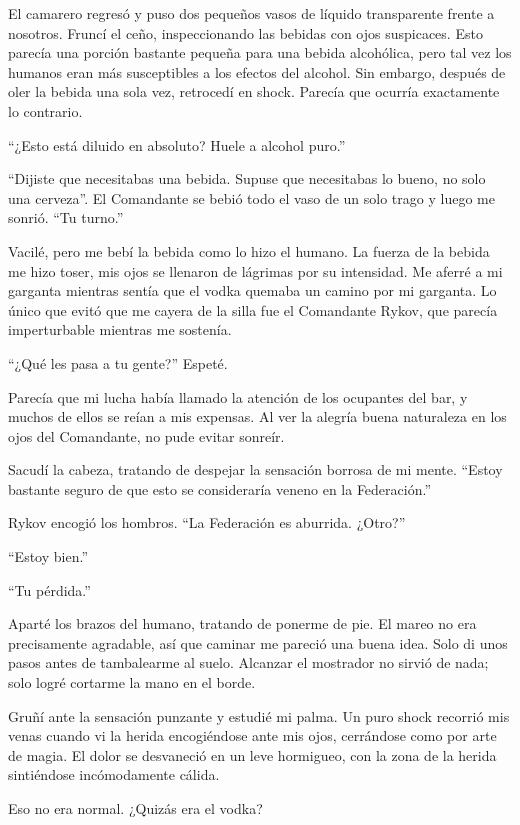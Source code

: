 \documentclass[spanish,12pt,a4paper,oneside,titlepage]{book}
\begin{document}
    El camarero regresó y puso dos pequeños vasos de líquido transparente frente a nosotros. Fruncí el ceño, inspeccionando las bebidas con ojos suspicaces. Esto parecía una porción bastante pequeña para una bebida alcohólica, pero tal vez los humanos eran más susceptibles a los efectos del alcohol. Sin embargo, después de oler la bebida una sola vez, retrocedí en shock. Parecía que ocurría exactamente lo contrario.

    ``¿Esto está diluido en absoluto? Huele a alcohol puro.''

    ``Dijiste que necesitabas una bebida. Supuse que necesitabas lo bueno, no solo una cerveza''. El Comandante se bebió todo el vaso de un solo trago y luego me sonrió. ``Tu turno.''

    Vacilé, pero me bebí la bebida como lo hizo el humano. La fuerza de la bebida me hizo toser, mis ojos se llenaron de lágrimas por su intensidad. Me aferré a mi garganta mientras sentía que el vodka quemaba un camino por mi garganta. Lo único que evitó que me cayera de la silla fue el Comandante Rykov, que parecía imperturbable mientras me sostenía.

    ``¿Qué les pasa a tu gente?'' Espeté.

    Parecía que mi lucha había llamado la atención de los ocupantes del bar, y muchos de ellos se reían a mis expensas. Al ver la alegría buena naturaleza en los ojos del Comandante, no pude evitar sonreír.

    Sacudí la cabeza, tratando de despejar la sensación borrosa de mi mente. ``Estoy bastante seguro de que esto se consideraría veneno en la Federación.''

    Rykov encogió los hombros. ``La Federación es aburrida. ¿Otro?''

    ``Estoy bien.''

    ``Tu pérdida.''

    Aparté los brazos del humano, tratando de ponerme de pie. El mareo no era precisamente agradable, así que caminar me pareció una buena idea. Solo di unos pasos antes de tambalearme al suelo. Alcanzar el mostrador no sirvió de nada; solo logré cortarme la mano en el borde.

    Gruñí ante la sensación punzante y estudié mi palma. Un puro shock recorrió mis venas cuando vi la herida encogiéndose ante mis ojos, cerrándose como por arte de magia. El dolor se desvaneció en un leve hormigueo, con la zona de la herida sintiéndose incómodamente cálida.

    Eso no era normal. ¿Quizás era el vodka?
\end{document}
